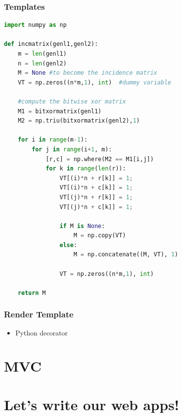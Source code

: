 \documentclass[fleqn,aspectratio=169,10pt]{beamer}
\begin{document}
\begin{frame}[fragile]
  \frametitle{Templates}
\begin{lstlisting}[language=Python]
import numpy as np

def incmatrix(genl1,genl2):
    m = len(genl1)
    n = len(genl2)
    M = None #to become the incidence matrix
    VT = np.zeros((n*m,1), int)  #dummy variable

    #compute the bitwise xor matrix
    M1 = bitxormatrix(genl1)
    M2 = np.triu(bitxormatrix(genl2),1)

    for i in range(m-1):
        for j in range(i+1, m):
            [r,c] = np.where(M2 == M1[i,j])
            for k in range(len(r)):
                VT[(i)*n + r[k]] = 1;
                VT[(i)*n + c[k]] = 1;
                VT[(j)*n + r[k]] = 1;
                VT[(j)*n + c[k]] = 1;

                if M is None:
                    M = np.copy(VT)
                else:
                    M = np.concatenate((M, VT), 1)

                VT = np.zeros((n*m,1), int)

    return M
\end{lstlisting}
\end{frame}

\begin{frame}
  \frametitle{Render Template}
  \begin{itemize}
    \item Python decorator
  \end{itemize}

\end{frame}

\section{MVC}

\section{Let's write our web apps!}
\end{document}
